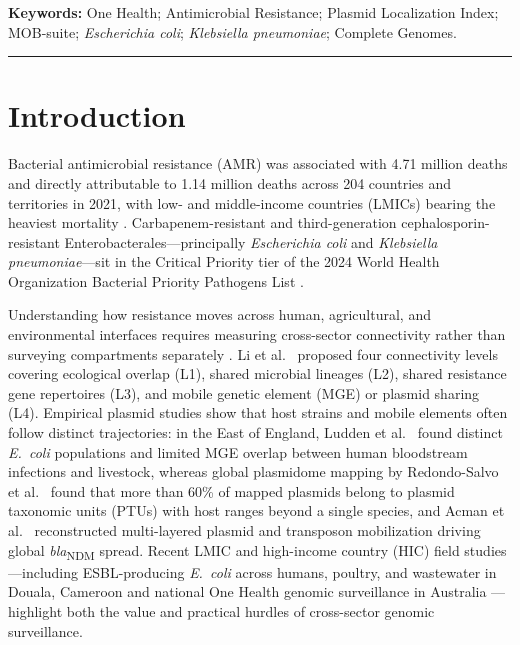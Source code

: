 \documentclass[11pt,a4paper]{article}
\begin{document}
\noindent\textbf{Keywords:} One Health; Antimicrobial Resistance; Plasmid Localization Index; MOB-suite; \textit{Escherichia coli}; \textit{Klebsiella pneumoniae}; Complete Genomes.

\vspace{2pt}
\noindent\rule{\linewidth}{0.6pt}

\section{Introduction}

Bacterial antimicrobial resistance (AMR) was associated with 4.71 million deaths and directly attributable to 1.14 million deaths across 204 countries and territories in 2021, with low- and middle-income countries (LMICs) bearing the heaviest mortality \cite{naghavi2024}. Carbapenem-resistant and third-generation cephalosporin-resistant Enterobacterales---principally \textit{Escherichia coli} and \textit{Klebsiella pneumoniae}---sit in the Critical Priority tier of the 2024 World Health Organization Bacterial Priority Pathogens List \cite{who2024}.

Understanding how resistance moves across human, agricultural, and environmental interfaces requires measuring cross-sector connectivity rather than surveying compartments separately \cite{arnold2024,li2025}. Li et al.\ \cite{li2025} proposed four connectivity levels covering ecological overlap (L1), shared microbial lineages (L2), shared resistance gene repertoires (L3), and mobile genetic element (MGE) or plasmid sharing (L4). Empirical plasmid studies show that host strains and mobile elements often follow distinct trajectories: in the East of England, Ludden et al.\ \cite{ludden2019} found distinct \textit{E.~coli} populations and limited MGE overlap between human bloodstream infections and livestock, whereas global plasmidome mapping by Redondo-Salvo et al.\ \cite{redondosalvo2020} found that more than 60\% of mapped plasmids belong to plasmid taxonomic units (PTUs) with host ranges beyond a single species, and Acman et al.\ \cite{acman2022} reconstructed multi-layered plasmid and transposon mobilization driving global \textit{bla}\textsubscript{NDM} spread. Recent LMIC and high-income country (HIC) field studies---including ESBL-producing \textit{E.~coli} across humans, poultry, and wastewater in Douala, Cameroon \cite{djokonono2026} and national One Health genomic surveillance in Australia \cite{watt2025}---highlight both the value and practical hurdles of cross-sector genomic surveillance.
\end{document}
